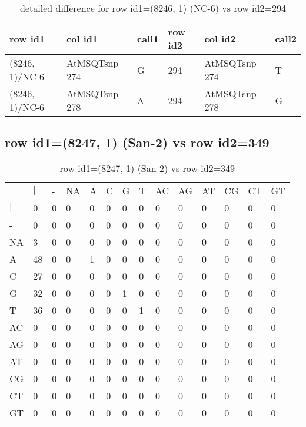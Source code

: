 \begin{center}
\begin{longtable}{|l|l|l|l|l|l|}
\caption{detailed difference for row id1=(8246, 1) (NC-6) vs row id2=294} \label{table_dm379}\\
\hline
row id1&col id1&call1&row id2&col id2&call2\\
\hline
(8246, 1)/NC-6&AtMSQTsnp 274&G&294&AtMSQTsnp 274&T\\
(8246, 1)/NC-6&AtMSQTsnp 278&A&294&AtMSQTsnp 278&G\\
\hline
\end{longtable}
\end{center}

\subsection{row id1=(8247, 1) (San-2) vs row id2=349}
\begin{center}
\begin{longtable}{|l|l|l|l|l|l|l|l|l|l|l|l|l|l|}
\caption{row id1=(8247, 1) (San-2) vs row id2=349} \label{table_dm380}\\
\hline
\\
\hline
&$|$&-&NA&A&C&G&T&AC&AG&AT&CG&CT&GT\\
$|$&0&0&0&0&0&0&0&0&0&0&0&0&0\\
-&0&0&0&0&0&0&0&0&0&0&0&0&0\\
NA&3&0&0&0&0&0&0&0&0&0&0&0&0\\
A&48&0&0&1&0&0&0&0&0&0&0&0&0\\
C&27&0&0&0&0&0&0&0&0&0&0&0&0\\
G&32&0&0&0&0&1&0&0&0&0&0&0&0\\
T&36&0&0&0&0&0&1&0&0&0&0&0&0\\
AC&0&0&0&0&0&0&0&0&0&0&0&0&0\\
AG&0&0&0&0&0&0&0&0&0&0&0&0&0\\
AT&0&0&0&0&0&0&0&0&0&0&0&0&0\\
CG&0&0&0&0&0&0&0&0&0&0&0&0&0\\
CT&0&0&0&0&0&0&0&0&0&0&0&0&0\\
GT&0&0&0&0&0&0&0&0&0&0&0&0&0\\
\hline
\end{longtable}
\end{center}

